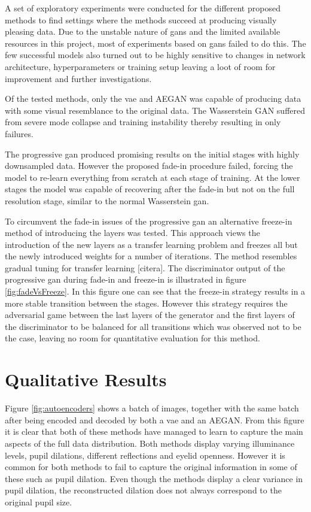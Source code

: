 A set of exploratory experiments were conducted for the different proposed methods to find settings where the methods succeed at producing visually pleasing data. Due to the unstable nature of \acrshort{gans} and the limited available resources in this project, most of experiments based on \acrshort{gans} failed to do this. The few successful models also turned out to be highly sensitive to changes in network architecture, hyperparameters or training setup leaving a loot of room for improvement and further investigations. 

Of the tested methods, only the \acrshort{vae} and AEGAN was capable of producing data with some visual resemblance to the original data. The Wasserstein GAN suffered from severe mode collapse and training instability thereby resulting in only failures.

The progressive \acrshort{gan} produced promising results on the initial stages with highly downsampled data. However the proposed fade-in procedure failed, forcing the model to re-learn everything from scratch at each stage of training. At the lower stages the model was capable of recovering after the fade-in but not on the full resolution stage, similar to the normal Wasserstein \acrshort{gan}. 

To circumvent the fade-in issues of the progressive \acrshort{gan} an alternative freeze-in method of introducing the layers was tested. This approach views the introduction of the new layers as a transfer learning problem and freezes all but the newly introduced weights for a number of iterations. The method resembles gradual tuning for transfer learning [citera]. The discriminator output of the progressive \acrshort{gan} during fade-in and freeze-in is illustrated in figure \ref{fig:fadeVsFreeze}. In this figure one can see that the freeze-in strategy results in a more stable transition between the stages. However this strategy requires the adversarial game between the last layers of the generator and the first layers of the discriminator to be balanced for all transitions which was observed not to be the case, leaving no room for quantitative evaluation for this method.


\section{Qualitative Results}
Figure \ref{fig:autoencoders} shows a batch of images, together with the same batch after being encoded and decoded by both a \acrshort{vae} and an AEGAN. From this figure it is clear that both of these methods have managed to learn to capture the main aspects of the full data distribution. Both methods display varying illuminance levels, pupil dilations, different reflections and eyelid openness. However it is common for both methods to fail to capture the original information in some of these such as pupil dilation. Even though the methods display a clear variance in pupil dilation, the reconstructed dilation does not always correspond to the original pupil size.

